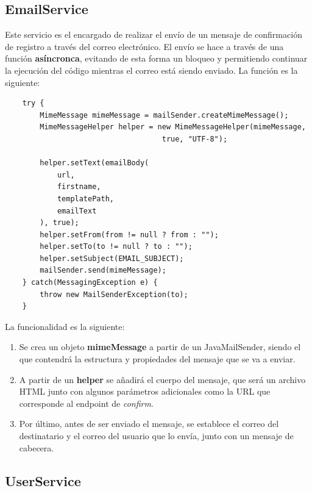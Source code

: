 \subsection{EmailService}

Este servicio es el encargado de realizar el envío de un mensaje de confirmación de registro a través del correo electrónico. El envío se hace a través de una función
\textbf{asíncronca}, evitando de esta forma un bloqueo y permitiendo continuar la ejecución del código mientras el correo está siendo enviado. La función es la siguiente:

\begin{verbatim}
    try {
        MimeMessage mimeMessage = mailSender.createMimeMessage();
        MimeMessageHelper helper = new MimeMessageHelper(mimeMessage, 
                                    true, "UTF-8");

        helper.setText(emailBody(
            url, 
            firstname, 
            templatePath,
            emailText             
        ), true);
        helper.setFrom(from != null ? from : "");
        helper.setTo(to != null ? to : "");
        helper.setSubject(EMAIL_SUBJECT);
        mailSender.send(mimeMessage);
    } catch(MessagingException e) {
        throw new MailSenderException(to);
    }
\end{verbatim}

La funcionalidad es la siguiente:

\begin{enumerate}
    \item Se crea un objeto \textbf{mimeMessage} a partir de un JavaMailSender, siendo el que contendrá la estructura y propiedades
    del mensaje que se va a enviar.
    
    \item A partir de un \textbf{helper} se añadirá el cuerpo del mensaje, que será un archivo HTML junto con algunos parámetros adicionales
    como la URL que corresponde al endpoint de \textit{confirm}.

    \item Por último, antes de ser enviado el mensaje, se establece el correo del destinatario y el correo del usuario que lo envía, junto con
    un mensaje de cabecera.
\end{enumerate}

\subsection{UserService}


